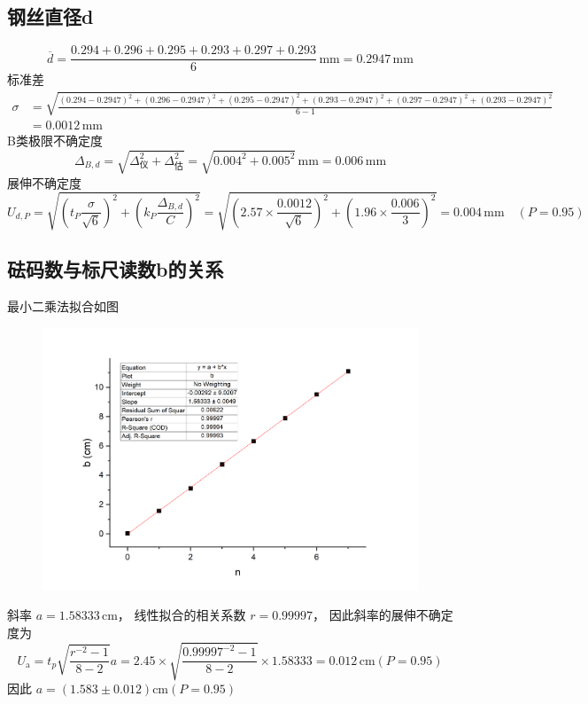 \documentclass{article}
\begin{document}
\subsection*{钢丝直径d}
$$
    \overline{d}=\frac{0.294+0.296+0.295+0.293+0.297+0.293}{6}\,\mathrm{mm}=0.2947\,\mathrm{mm}
$$
标准差
$$
    \begin{aligned}
        \sigma  & =\sqrt{\frac{(0.294-0.2947)^2+(0.296-0.2947)^2+(0.295-0.2947)^2+(0.293-0.2947)^2+(0.297-0.2947)^2+(0.293-0.2947)^2}{6-1}}\\
                   & =0.0012\,\mathrm{mm}
    \end{aligned}
$$
B类极限不确定度
$$
    \Delta_{B,d}=\sqrt{\Delta_\text{仪}^2+\Delta_\text{估}^2}=\sqrt{0.004^2+0.005^2}\,\mathrm{mm}=0.006\,\mathrm{mm}
$$
展伸不确定度
$$
        U_{d,P}  =\sqrt{\left(t_P\frac{\sigma}{\sqrt{6}}\right)^2+\left(k_P\frac{\Delta_{B,d}}{C}\right)^2}            =\sqrt{\left(2.57\times\frac{0.0012}{\sqrt{6}}\right)^2+\left(1.96\times\frac{0.006}{3}\right)^2}=0.004\,\mathrm{mm}\quad(P=0.95)
$$

\subsection*{砝码数与标尺读数b的关系}

最小二乘法拟合如图
\begin{figure}[htbp]
    \centering
    \includegraphics*[scale=0.6]{graph0.png}
\end{figure}

斜率
$    a=1.58333\,\mathrm{cm}
$，
线性拟合的相关系数
$
    r=0.99997
$，
因此斜率的展伸不确定度为
$$
    U_{\mathrm{a}}=t_p\sqrt{\frac{r^{-2}-1}{8-2}} a =2.45\times \sqrt{\frac{0.99997^{-2}-1}{8-2}}\times 1.58333 =0.012 \,\mathrm{cm} (P=0.95)
$$
因此 $a=(1.583 \pm 0.012) \mathrm{cm}(P=0.95)$
\end{document}
